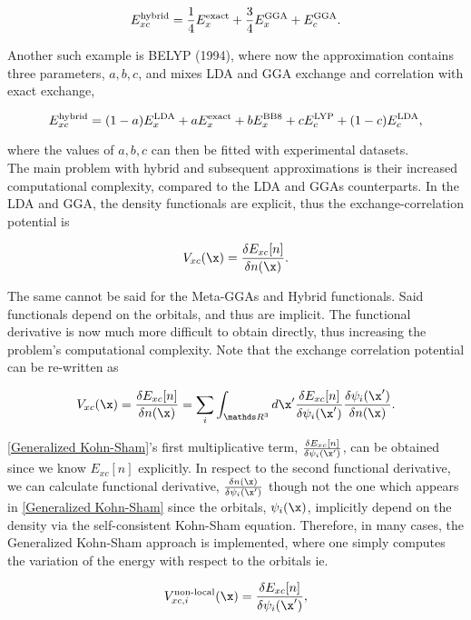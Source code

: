 \documentclass{homework}
\begin{document}
$$
    E_{xc}^{\textnormal{hybrid}} = \frac{1}{4}    E_{x}^{\textnormal{exact}} + \frac{3}{4}    E_{x}^{\textnormal{GGA}} + E_{c}^{\textnormal{GGA}}.
$$

Another such example is BELYP (1994), where now the approximation contains three parameters, $a, b, c$, and mixes LDA and GGA exchange and correlation with exact exchange, 

$$
    E_{xc}^{\textnormal{hybrid}} = (1-a)    E_{x}^{\textnormal{LDA}} + aE_{x}^{\textnormal{exact}} + bE_{x}^{\textnormal{BB8}} + cE_{c}^{\textnormal{LYP}} + (1-c)E_{c}^{\textnormal{LDA}},
$$

where the values of $a,b,c$ can then be fitted with experimental datasets. \\

The main problem with hybrid and subsequent approximations is their increased computational complexity, compared to the LDA and GGAs counterparts. In the LDA and GGA, the density functionals are explicit, thus the exchange-correlation potential is 

$$
V_{xc}(\x) = \frac{\delta E_{xc}[n]}{\delta n(\x)}.
$$

The same cannot be said for the Meta-GGAs and Hybrid functionals. Said functionals depend on the orbitals, and thus are implicit. The functional derivative is now much more difficult to obtain directly, thus increasing the problem's computational complexity. Note that the exchange correlation potential can be re-written as 

\begin{align}
V_{xc}(\x) = \frac{\delta E_{xc}[n]}{\delta n(\x)} = \sum_{i} \int_{\R^3} d\x' \frac{\delta E_{xc}[n]}{\delta \psi_i (\x')}\frac{\delta \psi_i (\x')}{\delta n(\x)}.
\label{Generalized Kohn-Sham}
\end{align}

\eqref{Generalized Kohn-Sham}'s first multiplicative term, $ \frac{\delta E_{xc}[n]}{\delta \psi_i (\x')}$, can be obtained since we know $E_{xc}[n]$ explicitly. In respect to the second functional derivative, we can calculate functional derivative, $\frac{\delta n(\x)}{\delta \psi_i (\x')}$ though not the one which appears in \eqref{Generalized Kohn-Sham} since the orbitals, $\psi_i(\x)$, implicitly depend on the density via the self-consistent Kohn-Sham equation. Therefore, in many cases, the Generalized Kohn-Sham approach is implemented, where one simply computes the variation of the energy with respect to the orbitals ie. 

$$
V_{xc, i}^{\textnormal{non-local}} (\x) = \frac{\delta E_{xc}[n]}{\delta \psi_i (\x')},
$$
\end{document}
